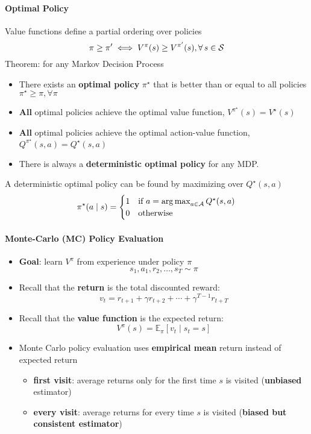 \paragraph{Optimal Policy} Value functions define a partial ordering over policies
\[
    \pi \geq \pi ' \iff V^{\pi }(s)\geq V^{\pi'}(s), \forall s\in \Sc
\]
Theorem: for any Markov Decision Process
\begin{itemize}
    \item There exists an \textbf{optimal policy} $\pi ^{\star} $ that is better than or equal to all policies $\pi ^{\star}\geq \pi,\forall \pi  $
    \item \textbf{All} optimal policies achieve the optimal value function, $V^{\pi ^{\star} }(s) = V^{\star}(s)$
    \item \textbf{All} optimal policies achieve the optimal action-value function, $Q^{\pi ^{\star} }(s,a) = Q^{\star}(s,a)$
    \item There is always a \textbf{deterministic optimal policy} for any MDP.
\end{itemize}
A deterministic optimal policy can be found by maximizing over $Q^{\star}(s,a) $
\[
    \pi ^{\star}(a\mid s) = \begin{cases}
        1 & \text{if } a = \operatorname*{arg\,max}_{a\in \mathcal{A}} Q^{\star}(s,a) \\
        0 & \text{otherwise}
    \end{cases} 
\]

\paragraph{Monte-Carlo (MC) Policy Evaluation}
\begin{itemize}
    \item \textbf{Goal}: learn $V^{\pi}$ from experience under policy $\pi$
    \[
    s_{1}, a_{1}, r_{2}, \ldots, s_{T} \sim \pi
    \]
    \item Recall that the \textbf{return} is the total discounted reward:
    \[
    v_{t}=r_{t+1}+\gamma r_{t+2}+\cdots+\gamma^{T-1} r_{t+T}
    \]
    \item Recall that the \textbf{value function} is the expected return:
    \[
    V^{\pi}(s)=\mathbb{E}_{\pi}\left[v_{t} \mid s_{t}=s\right]
    \]
    \item Monte Carlo policy evaluation uses \textbf{empirical mean} return instead of expected return
    \begin{itemize}
        \item \textbf{first visit}: average returns only for the first time $s$ is visited (\textbf{unbiased} estimator)
        \item \textbf{every visit}: average returns for every time $s$ is visited (\textbf{biased but consistent estimator})
    \end{itemize}
\end{itemize}

